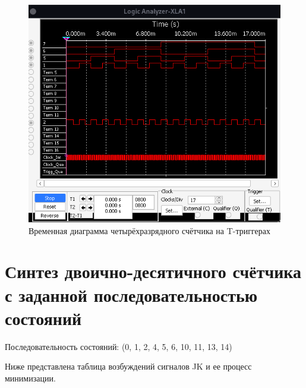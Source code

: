 \begin{figure}[ht]
    \centering
    \includegraphics[width=0.7\linewidth]{img/sc3.png}
    \caption{Временная диаграмма четырёхразрядного счётчика на T-триггерах}
    \label{sc3}
\end{figure}

\clearpage

\section{Синтез двоично-десятичного счётчика с заданной последовательностью состояний}

Последовательность состояний: (0, 1, 2, 4, 5, 6, 10, 11, 13, 14)

Ниже представлена таблица возбуждений сигналов JK и ее процесс минимизации.

